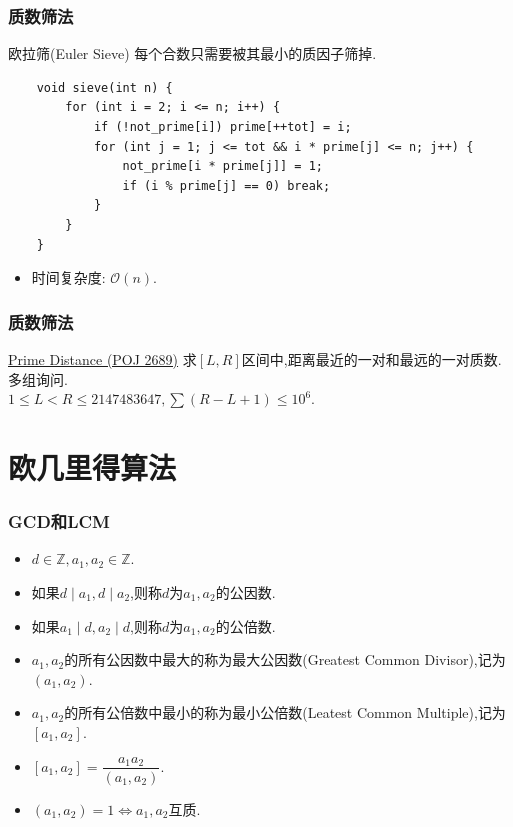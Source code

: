 \documentclass{beamer}
\newcommand{\pau}{}
\begin{document}
\begin{frame}[fragile]
    \frametitle{质数筛法}
    \begin{block}{欧拉筛(Euler Sieve)}
        每个合数只需要被其最小的质因子筛掉.
    \end{block} \pau
    \begin{verbatim}
    void sieve(int n) {
        for (int i = 2; i <= n; i++) {
            if (!not_prime[i]) prime[++tot] = i;
            for (int j = 1; j <= tot && i * prime[j] <= n; j++) {
                not_prime[i * prime[j]] = 1;
                if (i % prime[j] == 0) break;
            }
        }
    }
    \end{verbatim}
    \pau\begin{itemize}
        \item 时间复杂度: $\mathcal{O}(n)$.
    \end{itemize}
\end{frame}

\begin{frame}[fragile]
    \frametitle{质数筛法}
    \begin{exampleblock}{\href{http://poj.org/problem?id=2689}{Prime Distance (POJ 2689)}}
        求$[L,R]$区间中,距离最近的一对和最远的一对质数.多组询问.\\
        $1\leqslant L<R\leqslant2147483647,\sum(R-L+1)\leqslant10^6$.
    \end{exampleblock}
\end{frame}

\section{欧几里得算法}
\begin{frame}[fragile]
    \frametitle{GCD和LCM}
    \begin{itemize}
        \item $d\in\mathbb{Z},a_1,a_2\in\mathbb{Z}$.\pau
        \item 如果$d\mid a_1,d\mid a_2$,则称$d$为$a_1,a_2$的公因数. \pau
        \item 如果$a_1\mid d,a_2\mid d$,则称$d$为$a_1,a_2$的公倍数. \pau
        \item $a_1,a_2$的所有公因数中最大的称为最大公因数(Greatest Common Divisor),记为$(a_1,a_2)$. \pau
        \item $a_1,a_2$的所有公倍数中最小的称为最小公倍数(Leatest Common Multiple),记为$[a_1,a_2]$. \pau
        \item $[a_1,a_2]=\dfrac{a_1a_2}{(a_1,a_2)}$. \pau
        \item $(a_1,a_2)=1\Leftrightarrow a_1,a_2$互质.
    \end{itemize}
\end{frame}
\end{document}
